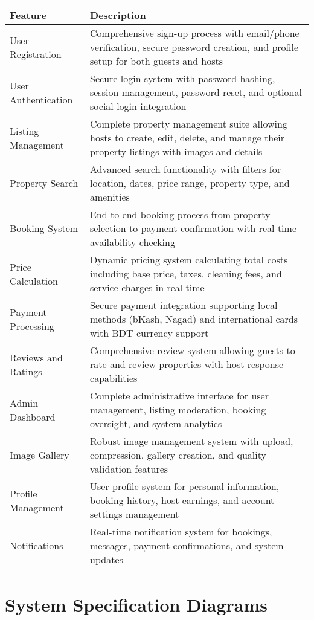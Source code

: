 \documentclass[12pt,a4paper]{report}
\begin{document}
\begin{longtable}{|p{4cm}|p{10cm}|}
\hline
\textbf{Feature} & \textbf{Description} \\
\hline
User Registration & Comprehensive sign-up process with email/phone verification, secure password creation, and profile setup for both guests and hosts \\
\hline
User Authentication & Secure login system with password hashing, session management, password reset, and optional social login integration \\
\hline
Listing Management & Complete property management suite allowing hosts to create, edit, delete, and manage their property listings with images and details \\
\hline
Property Search & Advanced search functionality with filters for location, dates, price range, property type, and amenities \\
\hline
Booking System & End-to-end booking process from property selection to payment confirmation with real-time availability checking \\
\hline
Price Calculation & Dynamic pricing system calculating total costs including base price, taxes, cleaning fees, and service charges in real-time \\
\hline
Payment Processing & Secure payment integration supporting local methods (bKash, Nagad) and international cards with BDT currency support \\
\hline
Reviews and Ratings & Comprehensive review system allowing guests to rate and review properties with host response capabilities \\
\hline
Admin Dashboard & Complete administrative interface for user management, listing moderation, booking oversight, and system analytics \\
\hline
Image Gallery & Robust image management system with upload, compression, gallery creation, and quality validation features \\
\hline
Profile Management & User profile system for personal information, booking history, host earnings, and account settings management \\
\hline
Notifications & Real-time notification system for bookings, messages, payment confirmations, and system updates \\
\hline
\end{longtable}

\chapter{System Specification Diagrams}
\end{document}
